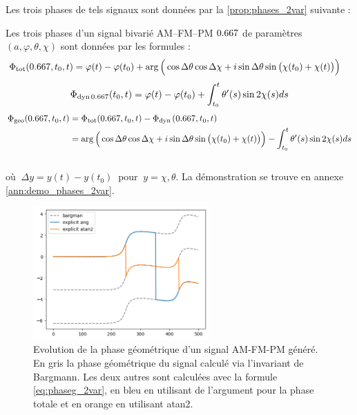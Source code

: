 Les trois phases de tels signaux sont données par la \cref{prop:phases_2var} suivante :
\begin{proposition}\label{prop:phases_2var}
	Les trois phases d'un signal bivarié AM--FM--PM $\x$ 	de paramètres $(a,\varphi,\theta,\chi)$ sont données par les formules :
	\begin{equation}\label{eq:phaset_2var}
		\begin{aligned}
			\phaset(\x,t_0,t) &= \varphi(t)-\varphi(t_0) + \arg\Big(\cos\Delta\theta \cos\Delta\chi + i\sin\Delta\theta \sin\big(\chi(t_0)+\chi(t)\big)\Big)
		\end{aligned}
	\end{equation}
	\begin{equation}\label{eq:phased_2var}
		\phased[\x](t_0,t) = \varphi(t) -\varphi(t_0) + \int_{t_0}^t\theta'(s) \sin2\chi(s) ds
	\end{equation}
	\begin{equation}\label{eq:phaseg_2var}
	\begin{aligned}
		\phaseg(\x,t_0,t) &= \phaset(\x,t_0,t) - \phased(\x,t_0,t) \\
			&= \arg\Big(\cos\Delta\theta \cos\Delta\chi + i\sin\Delta\theta \sin\big(\chi(t_0)+\chi(t)\big)\Big) - \int_{t_0}^t\theta'(s) \sin2\chi(s) ds
	\end{aligned}
	\end{equation}
	\\
	où $\ \Delta y = y(t) - y(t_0)\ $ pour $\ y = \chi, \theta$. La démonstration se trouve en annexe \ref{ann:demo_phases_2var}.
\end{proposition}

\begin{figure}[h]
	\includegraphics[width = 0.6\textwidth]{fig/premier_resultat}
	\caption[Evolution de la phase géométrique d'un signal AM-FM-PM]{Evolution de la phase géométrique d'un signal AM-FM-PM généré. En gris la phase géométrique du signal calculé via l'invariant de Bargmann. Les deux autres sont calculées avec la formule \cref{eq:phaseg_2var}, en bleu en utilisant de l'argument pour la phase totale et en orange en utilisant atan2.}
\end{figure}


